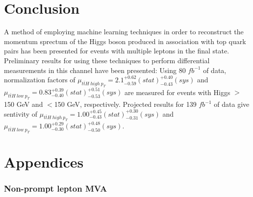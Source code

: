 \documentclass[NOTE, atlasdraft=true, texlive=2016, UKenglish]{\ATLASLATEXPATH atlasdoc}
\begin{document}
\part{Conclusion}
\label{part:conclusion}

A method of employing machine learning techniques in order to reconstruct the momentum sprectum of the Higgs boson produced in association with top quark pairs has been presented for events with multiple leptons in the final state. Preliminary results for using these techniques to perform differential measurements in this channel have been presented: Using 80 $fb^{-1}$ of data, normalization factors of $\mu_{t\bar{t}H\ high\ p_T} = 2.1^{+0.62}_{-0.59}(stat)^{+0.40}_{-0.43}(sys)$ and $\mu_{t\bar{t}H\ low\ p_T} = 0.83^{+0.39}_{-0.40}(stat)^{+0.51}_{-0.53}(sys)$ are measured for events with Higgs \pt $>$150 GeV and $<$150 GeV, respectively. Projected results for 139 $fb^{-1}$ of data give sentivity of $\mu_{t\bar{t}H\ high\ p_T} = 1.00^{+0.45}_{-0.43}(stat)^{+0.30}_{-0.31}(sys)$ and $\mu_{t\bar{t}H\ low\ p_T} = 1.00^{+0.29}_{-0.30}(stat)^{+0.48}_{-0.50}(sys)$.

\printbibliography
%
%

\clearpage
{}


\clearpage
\appendix
\part{Appendices}

\section{Non-prompt lepton MVA}
\label{sec:lepMVA}

\end{document}
